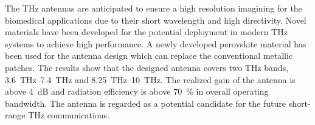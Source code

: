 \documentclass[12pt]{suhbook}
\begin{document}
The THz antennas are anticipated to ensure a high resolution imagining for the biomedical applications due to their short wavelength and high directivity. Novel materials have been developed for the potential deployment in modern THz systems to achieve high performance.  A newly developed perovskite material has been used for the antenna design which can replace the conventional metallic patches. The results show that the designed antenna covers two THz bands, \SIrange{3.6}{7.4}{\THz} and \SIrange{8.25}{10}{\THz}. The realized gain of the antenna is above \SI{4}{\dB} and radiation efficiency is above \SI{70}{\percent} in overall operating bandwidth. The antenna is regarded as a potential candidate for the future short-range THz communications.
% 
% 


\end{document}
